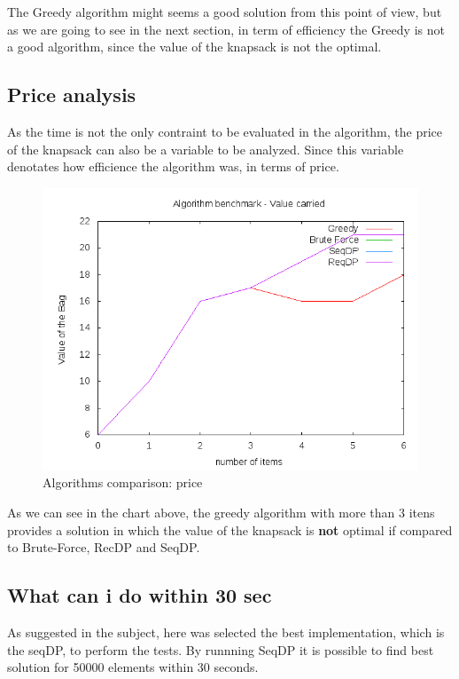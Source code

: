 \documentclass{article}
\begin{document}
The Greedy algorithm might seems a good solution from this point of view, but as we are going to see in the next section, 
in term of efficiency the Greedy is not a good algorithm, since the value of the knapsack is not the optimal.

\subsection{Price analysis}

As the time is not the only contraint to be evaluated in the algorithm, the price of the knapsack can also be a variable
to be analyzed. Since this variable denotates how efficience the algorithm was, in terms of price.

\begin{figure} [H]
\centering
\includegraphics[scale=0.5]{report/price_analysis}
\caption{Algorithms comparison: price}
\label{report/price_analysis}
\end{figure}

As we can see in the chart above, the greedy algorithm with more than 3 itens provides a solution in which the value of the 
knapsack is \textbf{not} optimal if compared to Brute-Force, RecDP and SeqDP.

\subsection{What can i do within 30 sec}

As suggested in the subject, here was selected the best implementation, which is the seqDP, to perform the tests. By runnning SeqDP it is 
possible to find best solution for 50000 elements within 30 seconds.
\end{document}
